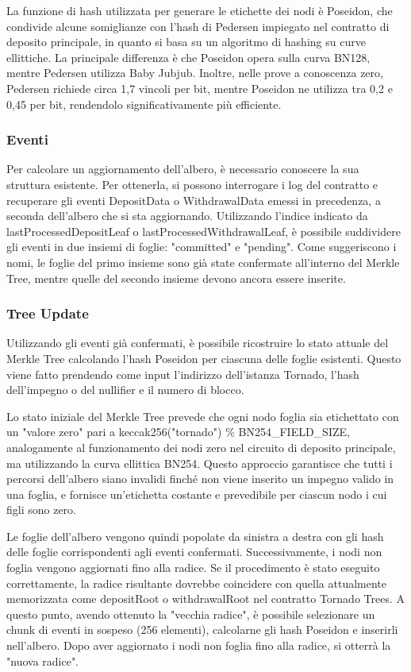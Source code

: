 La funzione di hash utilizzata per generare le etichette dei nodi è Poseidon, che condivide alcune somiglianze con l'hash di Pedersen impiegato nel contratto di deposito principale, in quanto si basa su un algoritmo di hashing su curve ellittiche. La principale differenza è che Poseidon opera sulla curva BN128, mentre Pedersen utilizza Baby Jubjub. Inoltre, nelle prove a conoscenza zero, Pedersen richiede circa 1,7 vincoli per bit, mentre Poseidon ne utilizza tra 0,2 e 0,45 per bit, rendendolo significativamente più efficiente.

\subsubsection{Eventi}

Per calcolare un aggiornamento dell'albero, è necessario conoscere la sua struttura esistente. Per ottenerla, si possono interrogare i log del contratto e recuperare gli eventi DepositData o WithdrawalData emessi in precedenza, a seconda dell'albero che si sta aggiornando.  
Utilizzando l'indice indicato da lastProcessedDepositLeaf o lastProcessedWithdrawalLeaf, è possibile suddividere gli eventi in due insiemi di foglie: "committed" e "pending". Come suggeriscono i nomi, le foglie del primo insieme sono già state confermate all'interno del Merkle Tree, mentre quelle del secondo insieme devono ancora essere inserite.

\subsubsection{Tree Update}

Utilizzando gli eventi già confermati, è possibile ricostruire lo stato attuale del Merkle Tree calcolando l'hash Poseidon per ciascuna delle foglie esistenti. Questo viene fatto prendendo come input l'indirizzo dell'istanza Tornado, l'hash dell'impegno o del nullifier e il numero di blocco.  

Lo stato iniziale del Merkle Tree prevede che ogni nodo foglia sia etichettato con un "valore zero" pari a keccak256("tornado") \% BN254\_FIELD\_SIZE, analogamente al funzionamento dei nodi zero nel circuito di deposito principale, ma utilizzando la curva ellittica BN254. Questo approccio garantisce che tutti i percorsi dell'albero siano invalidi finché non viene inserito un impegno valido in una foglia, e fornisce un'etichetta costante e prevedibile per ciascun nodo i cui figli sono zero.  

Le foglie dell'albero vengono quindi popolate da sinistra a destra con gli hash delle foglie corrispondenti agli eventi confermati. Successivamente, i nodi non foglia vengono aggiornati fino alla radice. Se il procedimento è stato eseguito correttamente, la radice risultante dovrebbe coincidere con quella attualmente memorizzata come depositRoot o withdrawalRoot nel contratto Tornado Trees.  
A questo punto, avendo ottenuto la "vecchia radice", è possibile selezionare un chunk di eventi in sospeso (256 elementi), calcolarne gli hash Poseidon e inserirli nell'albero. Dopo aver aggiornato i nodi non foglia fino alla radice, si otterrà la "nuova radice".  

